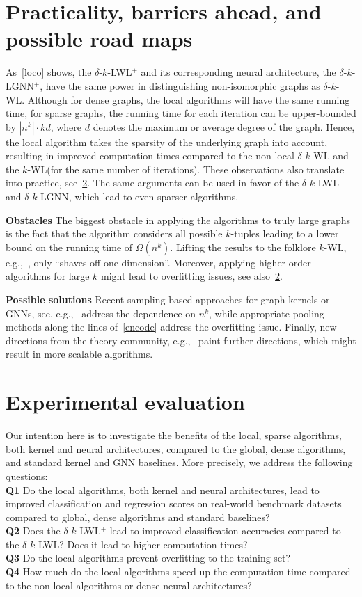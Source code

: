 \documentclass{article}
\newcommand{\xhdr}[1]{{\noindent\bfseries #1}}
\theoremstyle{definition}
\newcommand{\kwl}{$k$-\textsf{WL}\xspace}
\newcommand{\deltakwl}{$\delta$-$k$-\textsf{WL}\xspace}
\newcommand{\localkwl}{$\delta$-$k$-\textsf{LWL}\xspace}
\newcommand{\pluskwl}{$\delta$-$k$-\textsf{LWL}$^+$\xspace}
\newcommand{\localkwln}{$\delta$-$k$-\textsf{LGNN}\xspace}
\begin{document}
\section{Practicality, barriers ahead, and possible road maps}\label{prac_app}

As~\cref{loco} shows, the \pluskwl and its corresponding neural architecture, the \localkwln$\!\!^+$, have the same power in distinguishing non-isomorphic graphs as \deltakwl. Although for dense graphs, the local algorithms will have the same running time, for sparse graphs, the running time for each iteration can be upper-bounded by $|n^k|\cdot kd$, where $d$ denotes the maximum or average degree of the graph. Hence, the local algorithm takes the sparsity of the underlying graph into account, resulting in improved computation times compared to the non-local \deltakwl and the \kwl (for the same number of iterations). These observations also translate into practice, see~\cref{exp}. The same arguments can be used in favor of the \localkwl and \localkwln, which lead to even sparser algorithms. 

\xhdr{Obstacles} The biggest obstacle in applying the algorithms to truly large graphs is the fact that the algorithm considers all possible $k$-tuples leading to a lower bound on the running time of $\Omega(n^k)$. Lifting the results to the folklore \kwl, e.g.,~\cite{Mar+2019}, only ``shaves off one dimension''. Moreover, applying higher-order algorithms for large $k$ might lead to overfitting issues, see also~\cref{exp}. 

\xhdr{Possible solutions} Recent sampling-based approaches for graph kernels or GNNs, see, e.g.,~\cite{Che+2018,Che+2018a,Ham+2017,Hua+2018,Mor+2017} address the dependence on $n^k$, while appropriate pooling methods along the lines of~\cref{encode} address the overfitting issue. Finally, new directions from the theory community, e.g.,~\cite{Gro+2020a} paint further directions, which might result in more scalable algorithms.


\section{Experimental evaluation}\label{exp}

Our intention here is to investigate the benefits of the local, sparse algorithms, both kernel and neural architectures, compared to the global, dense algorithms, and standard kernel and GNN baselines.
More precisely, we address the following questions:\\
\xhdr{Q1} Do the local algorithms, both kernel and neural architectures, lead to improved classification and regression scores on real-world benchmark datasets compared to global, dense algorithms and standard baselines? \\
\xhdr{Q2}  Does the \pluskwl lead to improved classification accuracies compared to the  \localkwl? Does it lead to higher computation times?\\
\xhdr{Q3}  Do the local algorithms prevent overfitting to the training set?\\
\xhdr{Q4} How much do the local algorithms speed up the computation time compared to the non-local algorithms or dense neural architectures?
\end{document}
